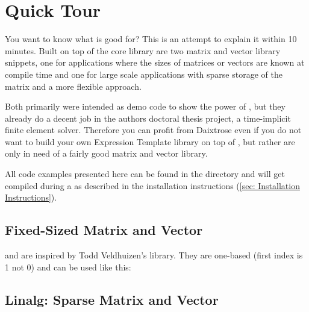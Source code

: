 \section{Quick Tour}
\label{sec: Quick Tour}

You want to know what \Daixtrose is good for? This is an attempt to explain it
within 10 minutes. Built on top of the core \Daixtrose library are two matrix and
vector library snippets, one for applications where the sizes of matrices or
vectors are known at compile time and one for large scale applications with 
sparse storage of the matrix and a more flexible approach.

Both primarily were intended as demo code to show the power of \Daixtrose, but
they already do a decent job in the authors doctoral thesis project, a
time-implicit finite element solver.  Therefore you can profit from Daixtrose
even if you do not want to build your own Expression Template library on top of
\Daixtrose, but rather are only in need of a fairly good matrix and vector
library.

All code examples presented here can be found in the directory
 and will get compiled during a  as described in the installation instructions (\ref{sec: Installation
  Instructions}).


\subsection{Fixed-Sized Matrix and Vector}
\label{sec: Fixed-Sized Matrix and Vector}

 and  are inspired by Todd
Veldhuizen's  library. They are one-based (first index is 1
not 0) and can be used like this:



\subsection{Linalg: Sparse Matrix and Vector}
\label{sec: Linalg: Sparse Matrix and Vector}

